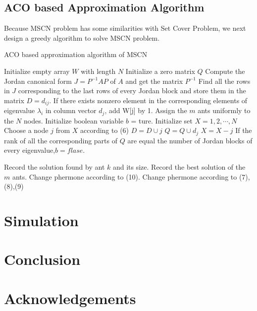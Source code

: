 \documentclass[10pt, conference, letterpaper]{IEEEtran}
\begin{document}
\subsection{ACO based Approximation Algorithm}
Because MSCN problem has some similarities with Set Cover Problem, we next design a greedy algorithm to solve MSCN problem.
\begin{algorithm}
\caption{ACO based approximation algorithm of MSCN}
\label{alg4}
\begin{algorithmic}[1]

\STATE Initialize empty array $W$ with length $N$
\STATE Initialize a zero matrix $Q$
\STATE Compute the Jordan canonical form $J=P^{-1}AP$ of $A$ and get the matrix $P^{-1}$
\STATE Find all the rows in $J$ corresponding to the last rows of every Jordan block and store them in the matrix $D = d_{ij}$.
\STATE If there exists nonzero element in the corresponding elements of eigenvalue $\lambda_i$ in column vector $d_j$, add W[j] by 1.
\ENDFOR
\ENDFOR
{}
\STATE Assign the $m$ ants uniformly to the $N$ nodes.
\STATE Initialize boolean variable $b$ = ture.
\STATE Initialize set $X={1,2,\cdots,N}$
\STATE Choose a node $j$  from $X$ according to (6)
\STATE $D= D\cup j$
\STATE $Q = Q \cup d_j$
\STATE $X=X-j$
\STATE If the rank of all the corresponding parts of $Q$ are equal the number of Jordan blocks of every eigenvalue,$ b = flase$.

\ENDWHILE
\STATE Record the solution found by ant $k$ and its size.
\ENDFOR
\STATE Record the best solution of the $m$ ants.
\STATE Change phermone according to (10).
\ENDIF
\STATE Change phermone according to (7),(8),(9)
\ENDWHILE
\end{algorithmic}
\end{algorithm}
\section{Simulation}


\section{Conclusion}

\section{Acknowledgements}


\end{document}
